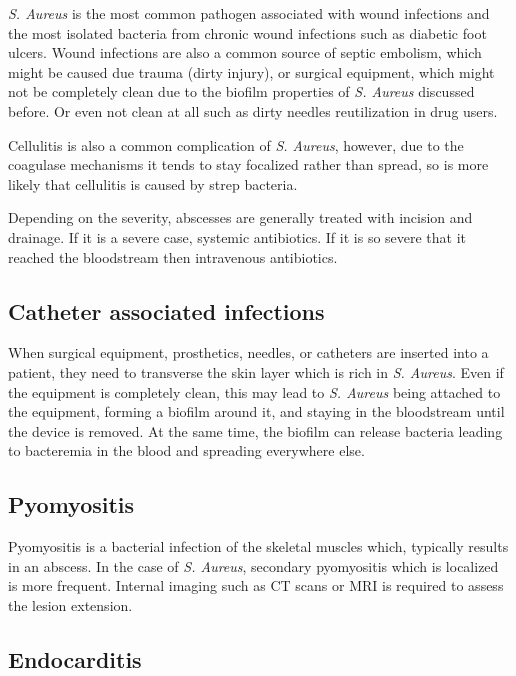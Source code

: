 \textit{S. Aureus} is the most common pathogen associated with wound infections and the most isolated bacteria from chronic wound infections \cite{Bhattacharya2015} such as diabetic foot ulcers. Wound infections are also a common source of septic embolism, which might be caused due trauma (dirty injury), or surgical equipment, which might not be completely clean due to the biofilm properties of \textit{S. Aureus} discussed before. Or even not clean at all such as dirty needles reutilization in drug users.

Cellulitis is also a common complication of \textit{S. Aureus}, however, due to the coagulase mechanisms it tends to stay focalized rather than spread, so is more likely that cellulitis is caused by strep bacteria. 

Depending on the severity, abscesses are generally treated with incision and drainage. If it is a severe case, systemic antibiotics. If it is so severe that it reached the bloodstream then intravenous antibiotics.

\subsection{Catheter associated infections}

When surgical equipment, prosthetics, needles, or catheters are inserted into a patient, they need to transverse the skin layer which is rich in \textit{S. Aureus}. Even if the equipment is completely clean, this may lead to \textit{S. Aureus} being attached to the equipment, forming a biofilm around it, and staying in the bloodstream until the device is removed. At the same time, the biofilm can release bacteria leading to bacteremia in the blood and spreading everywhere else.

\subsection{Pyomyositis}

Pyomyositis is a bacterial infection of the skeletal muscles which, typically results in an abscess. In the case of \textit{S. Aureus}, secondary pyomyositis which is localized is more frequent. Internal imaging such as CT scans or MRI is required to assess the lesion extension.

\subsection{Endocarditis}

